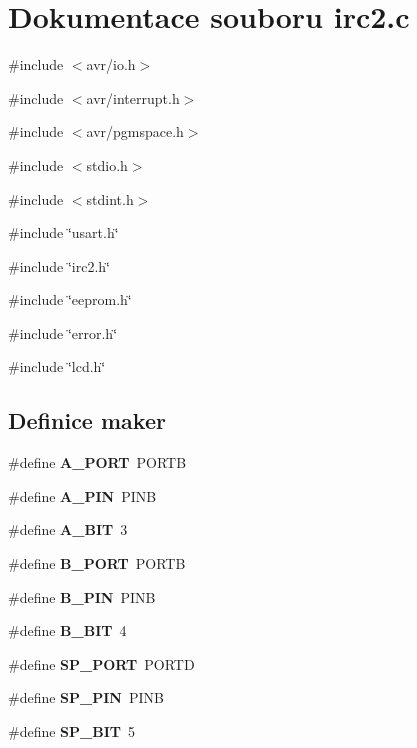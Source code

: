 \section{Dokumentace souboru irc2.c}
\label{irc2_8c}
{\ttfamily \#include $<$avr/io.h$>$}\par
{\ttfamily \#include $<$avr/interrupt.h$>$}\par
{\ttfamily \#include $<$avr/pgmspace.h$>$}\par
{\ttfamily \#include $<$stdio.h$>$}\par
{\ttfamily \#include $<$stdint.h$>$}\par
{\ttfamily \#include \char`\"{}usart.h\char`\"{}}\par
{\ttfamily \#include \char`\"{}irc2.h\char`\"{}}\par
{\ttfamily \#include \char`\"{}eeprom.h\char`\"{}}\par
{\ttfamily \#include \char`\"{}error.h\char`\"{}}\par
{\ttfamily \#include \char`\"{}lcd.h\char`\"{}}\par
\subsection*{Definice maker}
\begin{DoxyCompactItemize}
\item 
\#define {\bf A\_\-PORT}~PORTB
\item 
\#define {\bf A\_\-PIN}~PINB
\item 
\#define {\bf A\_\-BIT}~3
\item 
\#define {\bf B\_\-PORT}~PORTB
\item 
\#define {\bf B\_\-PIN}~PINB
\item 
\#define {\bf B\_\-BIT}~4
\item 
\#define {\bf SP\_\-PORT}~PORTD
\item 
\#define {\bf SP\_\-PIN}~PINB
\item 
\#define {\bf SP\_\-BIT}~5
\end{DoxyCompactItemize}

